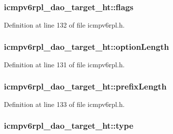 \subsubsection[{\texorpdfstring{flags}{flags}}]{ icmpv6rpl\+\_\+dao\+\_\+target\+\_\+ht\+::flags}\hypertarget{structicmpv6rpl__dao__target__ht_a551706298f953379914116f9a854c1d2}{}\label{structicmpv6rpl__dao__target__ht_a551706298f953379914116f9a854c1d2}


Definition at line 132 of file icmpv6rpl.\+h.

\subsubsection[{\texorpdfstring{option\+Length}{optionLength}}]{ icmpv6rpl\+\_\+dao\+\_\+target\+\_\+ht\+::option\+Length}\hypertarget{structicmpv6rpl__dao__target__ht_a3bf9ceae9d2d018b75b860d3cc361f29}{}\label{structicmpv6rpl__dao__target__ht_a3bf9ceae9d2d018b75b860d3cc361f29}


Definition at line 131 of file icmpv6rpl.\+h.

\subsubsection[{\texorpdfstring{prefix\+Length}{prefixLength}}]{ icmpv6rpl\+\_\+dao\+\_\+target\+\_\+ht\+::prefix\+Length}\hypertarget{structicmpv6rpl__dao__target__ht_a1d933bdc44251a725f47eb2af00ad9be}{}\label{structicmpv6rpl__dao__target__ht_a1d933bdc44251a725f47eb2af00ad9be}


Definition at line 133 of file icmpv6rpl.\+h.

\subsubsection[{\texorpdfstring{type}{type}}]{ icmpv6rpl\+\_\+dao\+\_\+target\+\_\+ht\+::type}\hypertarget{structicmpv6rpl__dao__target__ht_a8b951cda8d1be0ec43b06804ab5cb931}{}\label{structicmpv6rpl__dao__target__ht_a8b951cda8d1be0ec43b06804ab5cb931}



